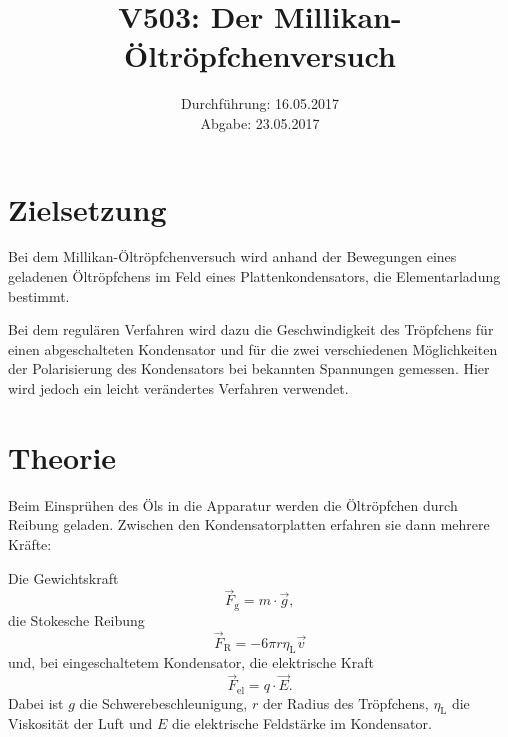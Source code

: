 \documentclass[
  bibliography=totoc,     %
  captions=tableheading,  %
  titlepage=firstiscover, %
]{scrartcl}
\title{V503: Der Millikan-Öltröpfchenversuch}
\author{
  Simon Schulte
  \texorpdfstring{
    \\
    \href{mailto:simon.schulte@udo.edu}{simon.schulte@udo.edu}
  }{}
  \texorpdfstring{\and}{, }
  Tim Sedlaczek
  \texorpdfstring{
    \\
    \href{mailto:tim.sedlaczek@udo.edu}{tim.sedlaczek@udo.edu}
  }{}
}
\date{Durchführung: 16.05.2017\\
      Abgabe: 23.05.2017}
\begin{document}
\maketitle
\thispagestyle{empty}
\tableofcontents
\newpage
\setcounter{page}{1}
\section{Zielsetzung}
\label{sec:zielsetzung}
Bei dem Millikan-Öltröpfchenversuch wird anhand der Bewegungen
eines geladenen Öltröpfchens im Feld eines Plattenkondensators, die Elementarladung bestimmt.

\noindent
Bei dem regulären Verfahren wird dazu die Geschwindigkeit des Tröpfchens
für einen abgeschalteten Kondensator und für die zwei verschiedenen
Möglichkeiten der Polarisierung des Kondensators bei bekannten Spannungen
gemessen.
Hier wird jedoch ein leicht verändertes Verfahren verwendet.
\section{Theorie}
\label{sec:theorie}
Beim Einsprühen des Öls in die Apparatur werden die Öltröpfchen
durch Reibung geladen. Zwischen den Kondensatorplatten
erfahren sie dann mehrere Kräfte:

\noindent
Die Gewichtskraft
\begin{equation}
  \vec{F}_ \mathup{g} = m \cdot \vec{g},
\end{equation}
die Stokesche Reibung
\begin{equation}
  \vec{F}_\mathup{R} = - 6 \pi r \eta_\mathup{L} \vec{v}
\end{equation}
und, bei eingeschaltetem Kondensator, die elektrische Kraft
\begin{equation}
  \vec{F}_\mathup{el} = q \cdot \vec{E}.
\end{equation}
Dabei ist $g$ die Schwerebeschleunigung, $r$ der Radius des Tröpfchens, $\eta_\mathup{L}$
die Viskosität der Luft und $E$ die elektrische Feldstärke im Kondensator.
\end{document}
